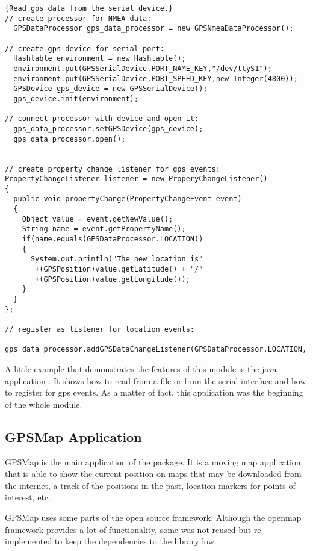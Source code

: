 \documentclass[a4paper]{article} %
\begin{document}
\begin{lstlisting}{Read gps data from the serial device.}
// create processor for NMEA data:
  GPSDataProcessor gps_data_processor = new GPSNmeaDataProcessor();

// create gps device for serial port:
  Hashtable environment = new Hashtable();
  environment.put(GPSSerialDevice.PORT_NAME_KEY,"/dev/ttyS1");
  environment.put(GPSSerialDevice.PORT_SPEED_KEY,new Integer(4800));
  GPSDevice gps_device = new GPSSerialDevice();
  gps_device.init(environment);

// connect processor with device and open it:
  gps_data_processor.setGPSDevice(gps_device);
  gps_data_processor.open();


// create property change listener for gps events:
PropertyChangeListener listener = new ProperyChangeListener()
{
  public void propertyChange(PropertyChangeEvent event)
  {
    Object value = event.getNewValue();
    String name = event.getPropertyName();
    if(name.equals(GPSDataProcessor.LOCATION))
    { 
      System.out.println("The new location is"
       +(GPSPosition)value.getLatitude() + "/"
       +(GPSPosition)value.getLongitude());
    }
  }
};

// register as listener for location events:
  gps_data_processor.addGPSDataChangeListener(GPSDataProcessor.LOCATION,listener);
\end{lstlisting}

A little example that demonstrates the features of this module is the
java application
. It shows how to
read from a file or from the serial interface and how to register for
gps events. As a matter of fact, this application was the beginning of
the whole module.


\subsection{GPSMap Application}
\label{SoftwareDesignOfTheGpstoolPackage-GpsmapApplication}

GPSMap is the main application of the 
package. It is a moving map application that is able to show the
current position on maps that may be downloaded from the internet, a
track of the positions in the past, location markers for points of
interest, etc.

GPSMap uses some parts of the open source
 framework. Although the
openmap framework provides a lot of functionality, some was not reused
but re-implemented to keep the dependencies to the library low.
\end{document}
